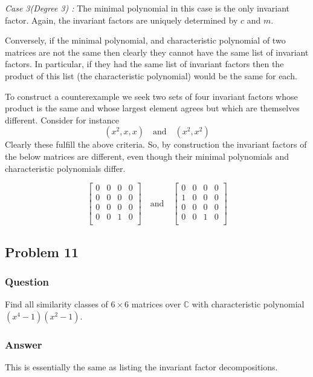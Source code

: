 \documentclass[12pt]{article}
\begin{document}
\emph{Case 3(Degree 3) : } The minimal polynomial in this case is the only invariant factor. Again, the invariant factors are uniquely determined by $c$ and $m$.

Conversely, if the minimal polynomial, and characteristic polynomial of two matrices are not the same then clearly they cannot have the same list of invariant factors. In particular, if they had the same list of invariant factors then the product of this list (the characteristic polynomial) would be the same for each.

To construct a counterexample we seek two sets of four invariant factors whose product is the same and whose largest element agrees but which are themselves different. Consider for instance
\[ (x^2,x,x) \quad \mathrm{and} \quad (x^2,x^2)
\]
Clearly these fulfill the above criteria. So, by construction the invariant factors of the below matrices are different, even though their minimal polynomials and characteristic polynomials differ.

\[\left[\begin{array}{cccc} 
0&0&0&0\\
0&0&0&0\\
0&0&0&0\\
0&0&1&0\\
\end{array} \right] \quad \mathrm{and} \quad 
\left[\begin{array}{cccc} 
0&0&0&0\\
1&0&0&0\\
0&0&0&0\\
0&0&1&0\\
\end{array} \right] 
\]

\subsection{Problem 11}

\subsubsection{Question}
Find all similarity classes of $6 \times 6$ matrices over $\mathbb{C}$ with characteristic polynomial $(x^4-1)(x^2-1)$.
\subsubsection{Answer}
This is essentially the same as listing the invariant factor decompositions. 
\end{document}
